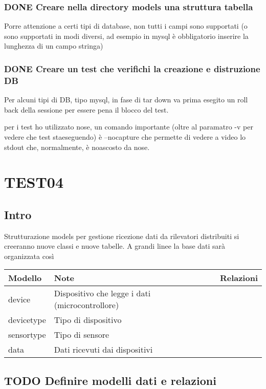 \documentclass[11pt]{article}
\begin{document}
\subsubsection{{\bfseries\sffamily DONE} Creare nella directory models una struttura tabella}
\label{sec-2-1-2}
Porre attenzione a certi tipi di database, non tutti i campi sono supportati
(o sono supportati in modi diversi, ad esempio in mysql è obbligatorio
inserire la lunghezza di un campo stringa)

\subsubsection{{\bfseries\sffamily DONE} Creare un test che verifichi la creazione e distruzione DB}
\label{sec-2-1-3}
Per alcuni tipi di DB, tipo mysql, in fase di tar down va prima esegito un roll back 
della sessione per essere pena il blocco del test.

per i test ho utilizzato nose, un comando importante (oltre al paramatro -v per vedere che test 
staeseguendo) è --nocapture che permette di vedere a video lo stdout che, normalmente, 
è noascosto da nose.
\section{TEST04}
\label{sec-3}
\subsection{Intro}
\label{sec-3-1}
Strutturazione models per gestione ricezione dati da rilevatori distribuiti
si creeranno nuove classi e nuove tabelle.
A grandi linee la base dati sarà organizzata così

\begin{center}
\begin{tabular}{lll}
Modello & Note & Relazioni\\
\hline
device & Dispositivo che legge i dati (microcontrollore) & \\
devicetype & Tipo di dispositivo & \\
sensortype & Tipo di sensore & \\
data & Dati ricevuti dai dispositivi & \\
\end{tabular}
\end{center}

\subsection{{\bfseries\sffamily TODO} Definire modelli dati e relazioni}
\label{sec-3-2}
\end{document}
